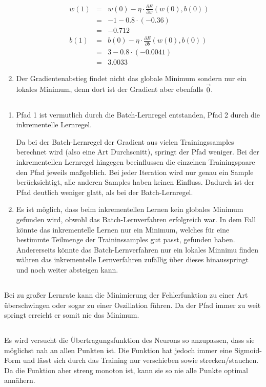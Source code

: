 \documentclass[DIN, pagenumber=false, fontsize=11pt, parskip=half]{scrartcl}
\begin{document}
\begin{enumerate}[label=(\alph*)]
            \begin{eqnarray*}
                w(1) &=& w(0) - \eta \cdot \frac{\partial E}{\partial w}(w(0),b(0)) \\
                &=& -1 - 0.8 \cdot (-0.36) \\
                &=& -0.712 \\
                b(1) &=& b(0) - \eta \cdot \frac{\partial E}{\partial b}(w(0), b(0)) \\
                &=& 3 - 0.8 \cdot (-0.0041) \\
                &=& 3.0033
            \end{eqnarray*}
        \item Der Gradientenabstieg findet nicht das globale Minimum sondern nur ein lokales Minimum, denn dort ist der Gradient aber ebenfalls $\vec{0}$.
    \end{enumerate}
    \subsection{}
    \begin{enumerate}[label=(\alph*)]
        \item Pfad 1 ist vermutlich durch die Batch-Lernregel entstanden, Pfad 2 durch die inkrementelle Lernregel. 

            Da bei der Batch-Lernregel der Gradient aus vielen Trainingssamples berechnet wird (also eine Art Durchscnitt), springt der Pfad weniger.
            Bei der inkrementellen Lernregel hingegen beeinflussen die einzelnen Trainingspaare den Pfad jeweils maßgeblich. Bei jeder Iteration wird nur genau ein Sample berücksichtigt, alle anderen Samples haben keinen Einfluss. Dadurch ist der Pfad deutlich weniger glatt, als bei der Batch-Lernregel.

        \item Es ist möglich, dass beim inkrementellen Lernen kein globales Minimum gefunden wird, obwohl das Batch-Lernverfahren erfolgreich war. In dem Fall könnte das inkrementelle Lernen nur ein Minimum, welches für eine bestimmte Teilmenge der Traininssamples gut passt, gefunden haben. Andererseits könnte das Batch-Lernverfahren nur ein lokales Minnimu finden währen das inkrementelle Lernverfahren \glqq{}zufällig\grqq{} über dieses hinausspringt und noch weiter absteigen kann.
    \end{enumerate}
    \subsection{}
    Bei zu großer Lernrate kann die Minimierung der Fehlerfunktion zu einer Art überschwingen oder sogar zu einer Oszillation führen. Da der Pfad immer zu weit \glqq{}springt\grqq{} erreicht er somit nie das Minimum.
    \subsection{}
    Es wird versucht die Übertragungsfunktion des Neurons so anzupassen, dass sie möglichst nah an allen Punkten ist. Die Funktion hat jedoch immer eine Sigmoid-Form und lässt sich durch das Training nur verschieben sowie strecken/stauchen. Da die Funktion aber streng monoton ist, kann sie so nie alle Punkte optimal annähern.
\end{document}
